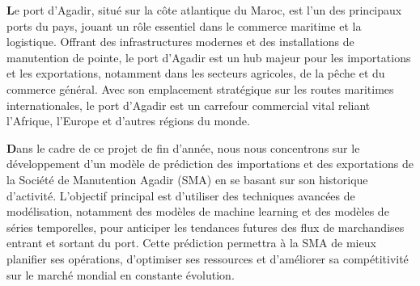 \documentclass[11pt]{article}
\begin{document}
\textbf{L}e port d'Agadir, situé sur la côte atlantique du Maroc, est l'un des principaux ports du pays, jouant un rôle essentiel dans le commerce maritime et la logistique. Offrant des infrastructures modernes et des installations de manutention de pointe, le port d'Agadir est un hub majeur pour les importations et les exportations, notamment dans les secteurs agricoles, de la pêche et du commerce général. Avec son emplacement stratégique sur les routes maritimes internationales, le port d'Agadir est un carrefour commercial vital reliant l'Afrique, l'Europe et d'autres régions du monde.\vspace{0.5cm}

\textbf{D}ans le cadre de ce projet de fin d'année, nous nous concentrons sur le développement d'un modèle de prédiction des importations et des exportations de la Société de Manutention Agadir (SMA) en se basant sur son historique d'activité. L'objectif principal est d'utiliser des techniques avancées de modélisation, notamment des modèles de machine learning et des modèles de séries temporelles, pour anticiper les tendances futures des flux de marchandises entrant et sortant du port. Cette prédiction permettra à la SMA de mieux planifier ses opérations, d'optimiser ses ressources et d'améliorer sa compétitivité sur le marché mondial en constante évolution.\vspace{0.5cm}
\end{document}
